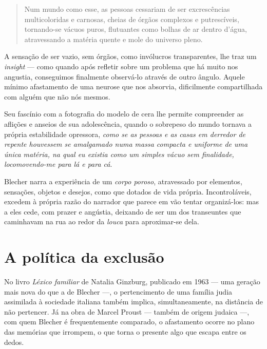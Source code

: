 \begin{quote}
Num mundo como esse, as pessoas cessariam de ser excrescências multicoloridas e carnosas, cheias de órgãos complexos e putrescíveis, tornando-se vácuos puros, flutuantes como bolhas de ar dentro d'água, atravessando a matéria quente e mole do universo pleno.
\end{quote}

A sensação de ser vazio, sem órgãos, como invólucros transparentes, lhe traz um \textit{insight} --- como quando após refletir sobre um problema que há muito nos angustia, conseguimos finalmente observá-lo através de outro ângulo. Aquele mínimo afastamento de uma neurose que nos absorvia, dificilmente compartilhada com alguém que não nós mesmos.

Seu fascínio com a fotografia do modelo de cera lhe permite compreender as aflições e anseios de sua adolescência, quando o sobrepeso do mundo tornava a própria estabilidade opressora, \textit{como se as pessoas e as casas em derredor de repente houvessem se amalgamado numa massa compacta e uniforme de uma única matéria, na qual eu existia como um simples vácuo sem finalidade, locomovendo-me para lá e para cá}.

Blecher narra a experiência de um \textit{corpo poroso}, atravessado por elementos, sensações, objetos e desejos, como que dotados de vida própria. Incontroláveis, excedem à própria razão do narrador que parece em vão tentar organizá-los: mas a eles cede, com prazer e angústia, deixando de ser um dos transeuntes que caminhavam na rua ao redor da \textit{louca} para aproximar-se dela.

\section{A política da exclusão}


No livro \textit{Léxico familiar} de Natalia Ginzburg, publicado em 1963 --- uma geração mais nova do que a de Blecher ---, o pertencimento de uma família judia assimilada à sociedade italiana também implica, simultaneamente, na distância de não pertencer. Já na obra de Marcel Proust --- também de origem judaica ---, com quem Blecher é frequentemente comparado, o afastamento ocorre no plano das memórias que irrompem, o que torna o presente algo que escapa entre os dedos.

